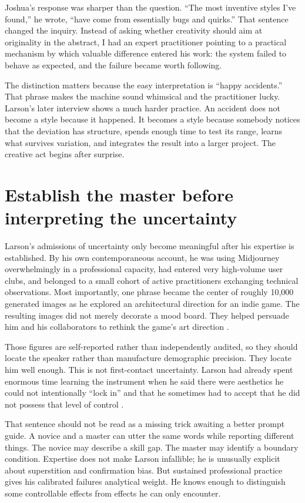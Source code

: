 \documentclass[11pt]{article}
\begin{document}
Joshua's response was sharper than the question. ``The most inventive styles I've found,'' he wrote, ``have come from essentially bugs and quirks.'' That sentence changed the inquiry. Instead of asking whether creativity should aim at originality in the abstract, I had an expert practitioner pointing to a practical mechanism by which valuable difference entered his work: the system failed to behave as expected, and the failure became worth following.

The distinction matters because the easy interpretation is ``happy accidents.'' That phrase makes the machine sound whimsical and the practitioner lucky. Larson's later interview shows a much harder practice. An accident does not become a style because it happened. It becomes a style because somebody notices that the deviation has structure, spends enough time to test its range, learns what survives variation, and integrates the result into a larger project. The creative act begins after surprise.

\section{Establish the master before interpreting the uncertainty}
Larson's admissions of uncertainty only become meaningful after his expertise is established. By his own contemporaneous account, he was using Midjourney overwhelmingly in a professional capacity, had entered very high-volume user clubs, and belonged to a small cohort of active practitioners exchanging technical observations. Most importantly, one phrase became the center of roughly 10,000 generated images as he explored an architectural direction for an indie game. The resulting images did not merely decorate a mood board. They helped persuade him and his collaborators to rethink the game's art direction \cite{Larson2022}.

Those figures are self-reported rather than independently audited, so they should locate the speaker rather than manufacture demographic precision. They locate him well enough. This is not first-contact uncertainty. Larson had already spent enormous time learning the instrument when he said there were aesthetics he could not intentionally ``lock in'' and that he sometimes had to accept that he did not possess that level of control \cite{Larson2022}.

That sentence should not be read as a missing trick awaiting a better prompt guide. A novice and a master can utter the same words while reporting different things. The novice may describe a skill gap. The master may identify a boundary condition. Expertise does not make Larson infallible; he is unusually explicit about superstition and confirmation bias. But sustained professional practice gives his calibrated failures analytical weight. He knows enough to distinguish some controllable effects from effects he can only encounter.
\end{document}
